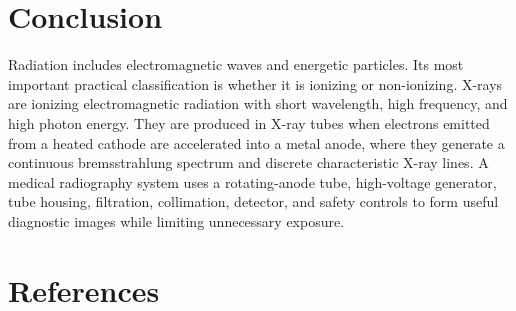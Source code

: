 \documentclass[12pt]{article}
\begin{document}
\section*{Conclusion}

Radiation includes electromagnetic waves and energetic particles. Its most important practical classification is whether it is ionizing or non-ionizing. X-rays are ionizing electromagnetic radiation with short wavelength, high frequency, and high photon energy. They are produced in X-ray tubes when electrons emitted from a heated cathode are accelerated into a metal anode, where they generate a continuous bremsstrahlung spectrum and discrete characteristic X-ray lines. A medical radiography system uses a rotating-anode tube, high-voltage generator, tube housing, filtration, collimation, detector, and safety controls to form useful diagnostic images while limiting unnecessary exposure.

\section*{References}
\end{document}
